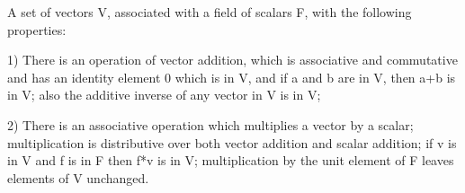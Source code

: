 A set of vectors V, associated with a field of scalars F, with the following properties:
\par
1) There is an operation of vector addition, which
is associative and commutative and has an identity element 0 which is
in V, and if a and b are in V, then a+b is in V; also the additive inverse of any vector
in V is in V;
\par
2) There is an associative operation which multiplies a vector by a scalar; multiplication
is distributive over both vector addition and scalar addition; if v is in V and f is
in F then f*v is in V; multiplication by the unit element of F leaves elements
of V unchanged.